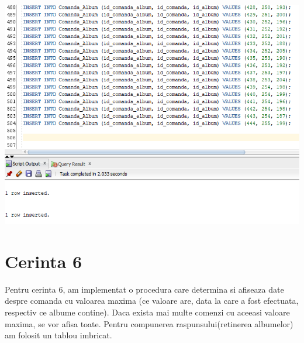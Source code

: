 \documentclass{article}
\begin{document}
\vspace{0.5cm}

\includegraphics[width=\textwidth]{4-gen.png}

\newpage
\section{Cerinta 6}
Pentru cerinta 6, am implementat o procedura care determina si afiseaza date despre comanda cu valoarea maxima (ce valoare are, data la care a fost efectuata, respectiv ce albume contine). Daca exista mai multe comenzi cu aceeasi valoare maxima, se vor afisa toate. Pentru compunerea raspunsului(retinerea albumelor) am folosit un tablou imbricat.
\end{document}
